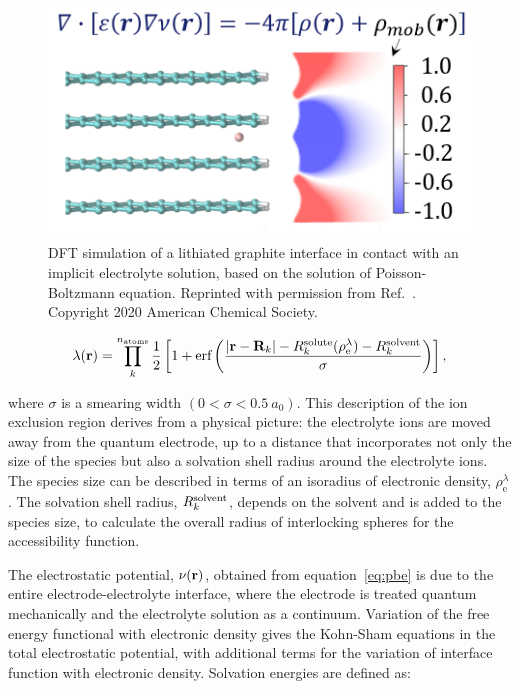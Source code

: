 \documentclass[../main.tex]{subfiles}
\begin{document}
\begin{figure}
    \centering
    \includegraphics[scale=0.7]{figures/DFT+Continuum.png}
    \caption{DFT simulation of a lithiated graphite interface in contact with an implicit electrolyte solution, based on the solution of Poisson-Boltzmann equation. Reprinted with permission from Ref.~. Copyright 2020 American Chemical Society.}
    \label{fig:DFT+continuum}
\end{figure}

\begin{equation}
    \label{eq:access}
    \lambda\!\left(\mathbf{r}\right) = \prod\limits_{k}^{n_\textrm{atoms}}\frac{1}{2} \left[1+\textrm{erf}\left(\frac{|\textbf{r}-\textbf{R}_k|-R^{\rm solute}_k(\rho_{\textrm{e}}^\lambda)-R^{\rm solvent}_k}{\sigma}\right)\right],
\end{equation}

where $\sigma$ is a smearing width $(0<\sigma<0.5~a_0)$. This description of the ion exclusion region derives from a physical picture: the electrolyte ions are moved away from the quantum electrode, up to a distance that incorporates not only the size of the species but also a solvation shell radius around the electrolyte ions. The species size can be described in terms of an isoradius of electronic density, $\rho_{\textrm{e}}^\lambda$. The solvation shell radius, $R^{\rm solvent}_k$, depends on the solvent and is added to the species size, to calculate the overall radius of interlocking spheres for the accessibility function.

The electrostatic potential, $\nu\!\left(\mathbf{r}\right)$, obtained from equation~\ref{eq:pbe} is due to the entire electrode-electrolyte interface, where the electrode is treated quantum mechanically and the electrolyte solution as a continuum. Variation of the free energy functional with electronic density gives the Kohn-Sham equations in the total electrostatic potential, with additional terms for the variation of interface function with electronic density.\cite{Dziedzic2011, Ringe2016} Solvation energies are defined as:\cite{Ringe2016, Stein2019}
\end{document}

